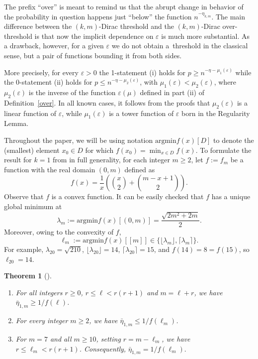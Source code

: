 \documentclass[reqno, 12pt]{amsart}
\numberwithin{equation}{section}
\numberwithin{figure}{section}
\def\argmin{\text{argmin}}
\let\epsilon=\varepsilon
\let\eps=\epsilon
\theoremstyle{plain}
\newtheorem{theorem}[thm]{Theorem}
\theoremstyle{definition}
\begin{document}
The prefix ``over'' is meant to remind us that the abrupt change in behavior of the probability in question happens just ``below'' the function $n^{-\eta_{k,m}}$. The main difference between the $(k,m)$-Dirac threshold  and the $(k,m)$-Dirac over-threshold  is that now the implicit dependence on $\epsilon$ is much more substantial. As a drawback, however, for a given $\eps$ we do not obtain a~threshold in the classical sense, but a pair of functions bounding it from both sides.

More precisely, for every $\eps>0$ the 1-statement (i) holds for $p\ge n^{-\eta-\mu_1(\eps)}$ while the 0-statement (ii) holds for $p\le n^{-\eta-\mu_2(\eps)}$, with $\mu_1(\eps)<\mu_2(\eps)$, where $\mu_2(\eps)$ is the inverse of the function $\eps(\mu)$ defined in part (ii) of Definition~\ref{over}. In all known cases, it follows from the proofs that $\mu_2(\eps)$ is a linear function of $\eps$, while $\mu_1(\eps)$ is a tower function of $\eps$ born in the Regularity Lemma.

\medskip
Throughout the paper, we will be using notation $\argmin f(x)[D]$ to denote the (smallest) element $x_0\in D$ for which $f(x_0)=\min_{x\in D}f(x)$.
To formulate the result for $k=1$ from \cite{ADR} in full generality, for each integer $m\ge2$, let $f:=f_m$  be a function with the real domain $(0,m)$ defined as
$$f(x)=\frac1{x}\left(\binom x2+\binom{m-x+1}{2}\right).$$
Observe that $f$ is a convex function. It can be easily checked that $f$ has a unique global minimum at
$$\lambda_m:=\argmin f(x)[(0,m)]= \frac{\sqrt{2m^2+2m}}{2}.$$
Moreover, owing to the convexity of $f$,
$$\ell_m:=\argmin f(x)[[m]]\in\{\lfloor\lambda_m\rfloor, \lceil\lambda_m\rceil\}.$$
For example, $\lambda_{20}=\sqrt{210}$, $\lfloor\lambda_{20}\rfloor = 14$, $\lceil\lambda_{20}\rceil = 15$, and $f(14)=8=f(15)$, so $\ell_{20} = 14$.

\begin{theorem}[\cite{ADR}]\label{23}~
\begin{enumerate}
    \item[(a)]	For all integers $r\ge0$, $r\le \ell<r(r+1)$ and $m=\ell+r$,  we have $\bar\eta_{1,m}\ge 1/f(\ell)$.
    \item[(b)]
    For every integer $m\geq 2$, we have $\bar\eta_{1,m}\le 1/f(\ell_m)$.
    \item[(c)] For $m=7$ and all $m\geq 10$, setting $r=m-\ell_m$, we have $r\le \ell_m<r(r+1)$. Consequently, $\bar \eta_{1,m} = 1/f(\ell_m).$
\end{enumerate}
\end{theorem}
	
\end{document}
